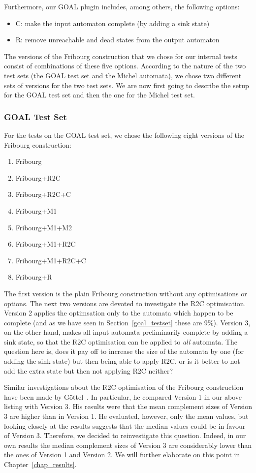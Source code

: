 Furthermore, our GOAL plugin includes, among others, the following options:
\begin{itemize}
\item C: make the input automaton complete (by adding a sink state)
\item R: remove unreachable and dead states from the output automaton
\end{itemize}

The versions of the Fribourg construction that we chose for our internal tests consist of combinations of these five options. According to the nature of the two test sets (the GOAL test set and the Michel automata), we chose two different sets of versions for the two test sets. We are now first going to describe the setup for the GOAL test set and then the one for the Michel test set.


\subsubsection{GOAL Test Set}

For the tests on the GOAL test set, we chose the following eight versions of the Fribourg construction:
\begin{enumerate}
\item Fribourg
\item Fribourg+R2C
\item Fribourg+R2C+C
\item Fribourg+M1
\item Fribourg+M1+M2
\item Fribourg+M1+R2C
\item Fribourg+M1+R2C+C
\item Fribourg+R
\end{enumerate}

The first version is the plain Fribourg construction without any optimisations or options. The next two versions are devoted to investigate the R2C optimisation. Version 2 applies the optimsation only to the automata which happen to be complete (and as we have seen in Section~\ref{goal_testset} these are 9\%). Version 3, on the other hand, makes all input automata preliminarily complete by adding a sink state, so that the R2C optimisation can be applied to \textit{all} automata. The question here is, does it pay off to increase the size of the automata by one (for adding the sink state) but then being able to apply R2C, or is it better to not add the extra state but then not applying R2C neither?

Similar investigations about the R2C optimisation of the Fribourg construction have been made by Göttel~\cite{2013_bsc_goettel}. In particular, he compared Version 1 in our above listing with Version 3. His results were that the mean complement sizes of Version 3 are higher than in Version 1. He evaluated, however, only the mean values, but looking closely at the results suggests that the median values could be in favour of Version 3. Therefore, we decided to reinvestigate this question. Indeed, in our own results the median complement sizes of Version 3 are considerably lower than the ones of Version 1 and Version 2. We will further elaborate on this point in Chapter~\ref{chap_results}.

